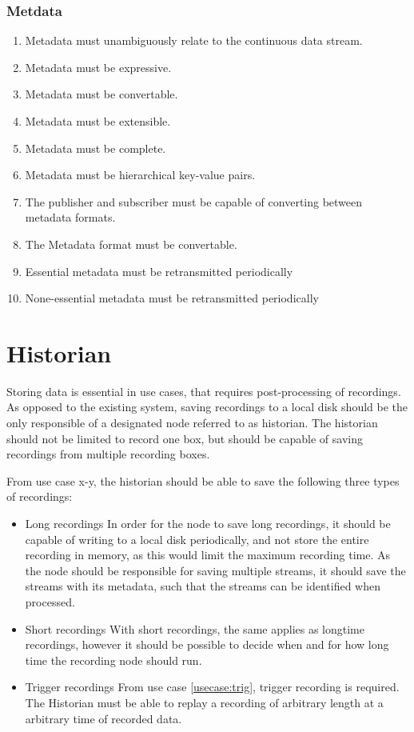 \subsubsection{Metdata}

\begin{enumerate}
	\item Metadata must unambiguously relate to the continuous data stream.
	\item Metadata must be expressive.
	\item Metadata must be convertable.
	\item Metadata must be extensible.
	\item Metadata must be complete.
	\item Metadata must be hierarchical key-value pairs.
	\item The publisher and subscriber must be capable of converting between metadata formats.
	\item The Metadata format must be convertable.
	\item Essential metadata must be retransmitted periodically
	\item None-essential metadata must be retransmitted periodically
\end{enumerate}


\section{Historian}

Storing data is essential in use cases, that requires post-processing of recordings. As opposed to the existing system, saving recordings to a local disk should be the only responsible of a designated node referred to as historian.
The historian should not be limited to record one box, but should be capable of saving recordings from multiple recording boxes.

From use case x-y, the historian should be able to save the following three types of recordings:
\begin{itemize}
	\item Long recordings
		In order for the node to save long recordings, it should be capable of writing 			to a local disk periodically, and not store the entire recording in memory, 			as this would limit the maximum recording time. As the node should be responsible for 				saving multiple streams, it should save the streams with its metadata, such that the streams can be identified when processed.
	\item Short recordings
		With short recordings, the same applies as longtime recordings, however it 				should be possible to decide when and for how long time the recording node should 			run.
	\item Trigger recordings
		From use case \ref{usecase:trig}, trigger recording is required. The Historian must be able to replay a recording of arbitrary length at a arbitrary time of recorded data.
\end{itemize}


